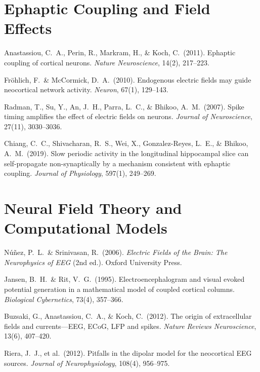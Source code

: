 \documentclass[11pt,a4paper]{report}
\begin{document}
\section*{Ephaptic Coupling and Field Effects}
\begin{enumerate}[label={[\arabic*]}, leftmargin=2.5em, start=8]
  \item Anastassiou, C.\ A., Perin, R., Markram, H., \& Koch, C.\ (2011). Ephaptic coupling of cortical neurons. \textit{Nature Neuroscience}, 14(2), 217--223.
  \item Fr\"ohlich, F.\ \& McCormick, D.\ A.\ (2010). Endogenous electric fields may guide neocortical network activity. \textit{Neuron}, 67(1), 129--143.
  \item Radman, T., Su, Y., An, J.\ H., Parra, L.\ C., \& Bhikoo, A.\ M.\ (2007). Spike timing amplifies the effect of electric fields on neurons. \textit{Journal of Neuroscience}, 27(11), 3030--3036.
  \item Chiang, C.\ C., Shivacharan, R.\ S., Wei, X., Gonzalez-Reyes, L.\ E., \& Bhikoo, A.\ M.\ (2019). Slow periodic activity in the longitudinal hippocampal slice can self-propagate non-synaptically by a mechanism consistent with ephaptic coupling. \textit{Journal of Physiology}, 597(1), 249--269.
\end{enumerate}

\section*{Neural Field Theory and Computational Models}
\begin{enumerate}[label={[\arabic*]}, leftmargin=2.5em, start=12]
  \item N\'u\~nez, P.\ L.\ \& Srinivasan, R.\ (2006). \textit{Electric Fields of the Brain: The Neurophysics of EEG} (2nd ed.). Oxford University Press.
  \item Jansen, B.\ H.\ \& Rit, V.\ G.\ (1995). Electroencephalogram and visual evoked potential generation in a mathematical model of coupled cortical columns. \textit{Biological Cybernetics}, 73(4), 357--366.
  \item Buzsaki, G., Anastassiou, C.\ A., \& Koch, C.\ (2012). The origin of extracellular fields and currents---EEG, ECoG, LFP and spikes. \textit{Nature Reviews Neuroscience}, 13(6), 407--420.
  \item Riera, J.\ J., et al.\ (2012). Pitfalls in the dipolar model for the neocortical EEG sources. \textit{Journal of Neurophysiology}, 108(4), 956--975.
\end{enumerate}
\end{document}
